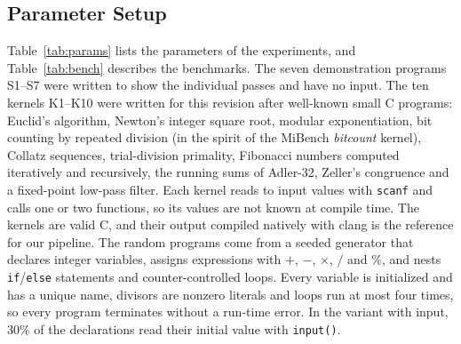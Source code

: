 \documentclass{ieeeaccess}
\begin{document}
\subsection{Parameter Setup}
Table~\ref{tab:params} lists the parameters of the experiments, and Table~\ref{tab:bench} describes the benchmarks. The seven demonstration programs S1--S7 were written to show the individual passes and have no input. The ten kernels K1--K10 were written for this revision after well-known small C programs: Euclid's algorithm, Newton's integer square root, modular exponentiation, bit counting by repeated division (in the spirit of the MiBench \emph{bitcount} kernel), Collatz sequences, trial-division primality, Fibonacci numbers computed iteratively and recursively, the running sums of Adler-32, Zeller's congruence and a fixed-point low-pass filter. Each kernel reads \ninputsKMin{} to \ninputsKMax{} input values with \texttt{scanf} and calls one or two functions, so its values are not known at compile time. The kernels are valid C, and their output compiled natively with clang is the reference for our pipeline. The random programs come from a seeded generator that declares integer variables, assigns expressions with $+$, $-$, $\times$, $/$ and $\%$, and nests \texttt{if}/\texttt{else} statements and counter-controlled loops. Every variable is initialized and has a unique name, divisors are nonzero literals and loops run at most four times, so every program terminates without a run-time error. In the variant with input, 30\% of the declarations read their initial value with \texttt{input()}.
\end{document}
